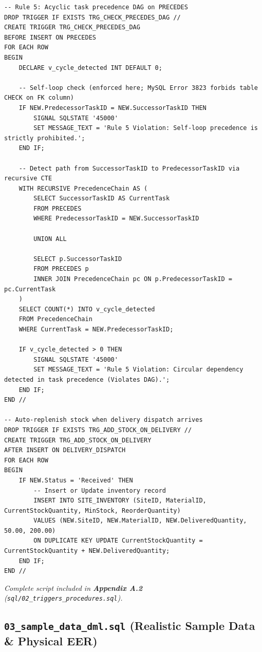 \documentclass[a4paper,12pt]{report}
\begin{document}
\begin{lstlisting}
-- Rule 5: Acyclic task precedence DAG on PRECEDES
DROP TRIGGER IF EXISTS TRG_CHECK_PRECEDES_DAG //
CREATE TRIGGER TRG_CHECK_PRECEDES_DAG
BEFORE INSERT ON PRECEDES
FOR EACH ROW
BEGIN
    DECLARE v_cycle_detected INT DEFAULT 0;

    -- Self-loop check (enforced here; MySQL Error 3823 forbids table CHECK on FK column)
    IF NEW.PredecessorTaskID = NEW.SuccessorTaskID THEN
        SIGNAL SQLSTATE '45000'
        SET MESSAGE_TEXT = 'Rule 5 Violation: Self-loop precedence is strictly prohibited.';
    END IF;

    -- Detect path from SuccessorTaskID to PredecessorTaskID via recursive CTE
    WITH RECURSIVE PrecedenceChain AS (
        SELECT SuccessorTaskID AS CurrentTask
        FROM PRECEDES
        WHERE PredecessorTaskID = NEW.SuccessorTaskID
        
        UNION ALL
        
        SELECT p.SuccessorTaskID
        FROM PRECEDES p
        INNER JOIN PrecedenceChain pc ON p.PredecessorTaskID = pc.CurrentTask
    )
    SELECT COUNT(*) INTO v_cycle_detected
    FROM PrecedenceChain
    WHERE CurrentTask = NEW.PredecessorTaskID;

    IF v_cycle_detected > 0 THEN
        SIGNAL SQLSTATE '45000'
        SET MESSAGE_TEXT = 'Rule 5 Violation: Circular dependency detected in task precedence (Violates DAG).';
    END IF;
END //

-- Auto-replenish stock when delivery dispatch arrives
DROP TRIGGER IF EXISTS TRG_ADD_STOCK_ON_DELIVERY //
CREATE TRIGGER TRG_ADD_STOCK_ON_DELIVERY
AFTER INSERT ON DELIVERY_DISPATCH
FOR EACH ROW
BEGIN
    IF NEW.Status = 'Received' THEN
        -- Insert or Update inventory record
        INSERT INTO SITE_INVENTORY (SiteID, MaterialID, CurrentStockQuantity, MinStock, ReorderQuantity)
        VALUES (NEW.SiteID, NEW.MaterialID, NEW.DeliveredQuantity, 50.00, 200.00)
        ON DUPLICATE KEY UPDATE CurrentStockQuantity = CurrentStockQuantity + NEW.DeliveredQuantity;
    END IF;
END //
\end{lstlisting}

\emph{Complete script included in \textbf{Appendix A.2} (\texttt{sql/02\_\allowbreak{}triggers\_\allowbreak{}procedures.\allowbreak{}sql}).}

\subsection{\texorpdfstring{\texttt{03\_\allowbreak{}sample\_\allowbreak{}data\_\allowbreak{}dml.\allowbreak{}sql} (Realistic Sample Data \& Physical EER)}{03sampledatadml.sql (Realistic Sample Data \& Physical EER)}}\label{sample_data_dml.sql-realistic-sample-data-physical-eer}
\end{document}
